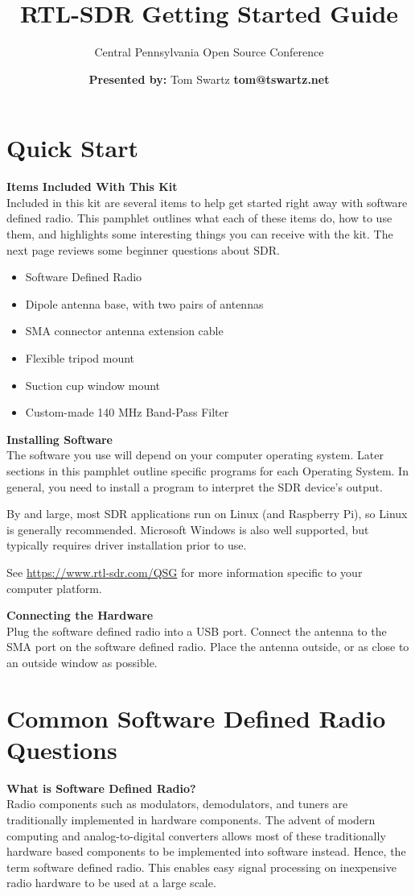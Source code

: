 \documentclass[10pt,foldmark,notumble]{leaflet}
\title{RTL-SDR Getting Started Guide}
\author{Central Pennsylvania Open Source Conference}
\date{{\scriptsize \textbf{Presented by:} Tom Swartz \hfill \textbf{tom@tswartz.net}}}
\begin{document}
\maketitle
\thispagestyle{empty}
\section{Quick Start\color{red}\hrulefill\color{black}}
\textbf{Items Included With This Kit}\\
Included in this kit are several items to help get started right away with
software defined radio.
This pamphlet outlines what each of these items do, how to use them,
and highlights some interesting things you can receive with the kit.
The next page reviews some beginner questions about SDR\@.
\begin{itemize}
        \item Software Defined Radio
        \item Dipole antenna base, with two pairs of antennas
        \item SMA connector antenna extension cable
        \item Flexible tripod mount
        \item Suction cup window mount
        \item Custom-made 140 MHz Band-Pass Filter
\end{itemize}

\textbf{Installing Software}\\
The software you use will depend on your computer operating system. Later
sections in this pamphlet outline specific programs for each Operating System.
In general, you need to install a program to interpret the SDR device's
output.

By and large, most SDR applications run on Linux (and Raspberry
Pi), so Linux is generally recommended.
Microsoft Windows is also well supported, but typically requires driver
installation prior to use.

See \url{https://www.rtl-sdr.com/QSG} for more information specific to your
computer platform.

\textbf{Connecting the Hardware}\\
Plug the software defined radio into a USB port.
Connect the antenna to the SMA port on the software defined radio.
Place the antenna outside, or as close to an outside window as possible.

\section{Common Software Defined Radio Questions\color{red}\hrulefill\color{black}}
\textbf{What is Software Defined Radio?}\\
Radio components such as modulators, demodulators, and tuners are traditionally
implemented in hardware components. The advent of modern computing and
analog-to-digital converters allows most of these traditionally hardware based
components to be implemented into software instead. Hence, the term software
defined radio. This enables easy signal processing on inexpensive radio hardware
to be used at a large scale.
\end{document}
